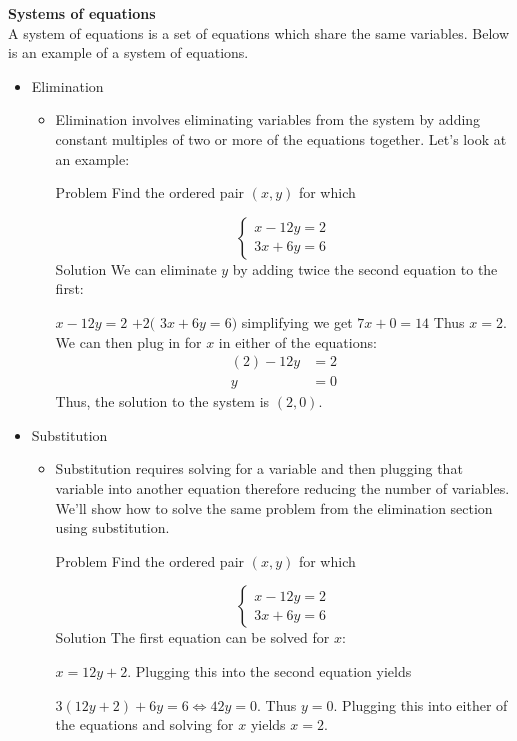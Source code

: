 \documentclass[11pt,letterpaper]{article}
\begin{document}
\begin{minipage}{\textwidth}
     \vspace{0.4cm}
     \noindent \textbf{Systems of equations}\\
     A system of equations is a set of equations which share the same variables. Below is an example of a system of equations.
     \begin{itemize}
          \item Elimination
          \begin{itemize}
               \item  Elimination involves eliminating variables from the system by adding constant multiples of two or more of the equations together. Let's look at an example:

               Problem
               Find the ordered pair $(x,y)$ for which
               
               \[\left\{\begin{array}{l}x-12y=2\\3x+6y=6\end{array}\right.\]
               Solution
               We can eliminate $y$ by adding twice the second equation to the first:
               
               $x - 12y= 2$
               $+2($	$3x + 6y = 6)$
               simplifying we get ${7x + 0=14}$
               Thus $x=2$. We can then plug in for $x$ in either of the equations:\begin{align*} (2)-12y &= 2 \\ y &= 0 \end{align*}
               Thus, the solution to the system is $(2,0)$.
          \end{itemize}
          \item Substitution
          \begin{itemize}
               \item Substitution requires solving for a variable and then plugging that variable into another equation therefore reducing the number of variables. We'll show how to solve the same problem from the elimination section using substitution.

               Problem
               Find the ordered pair $(x,y)$ for which
               
               \[\left\{\begin{array}{l}x-12y=2\\3x+6y=6\end{array}\right.\]
               Solution
               The first equation can be solved for $x$:
               
               $x = 12y + 2.$
               Plugging this into the second equation yields
               
               $3(12y + 2) + 6y = 6 \Leftrightarrow 42 y = 0.$
               Thus $y=0$. Plugging this into either of the equations and solving for $x$ yields $x=2$.
          \end{itemize}
     \end{itemize}
\end{minipage}
\end{document}
